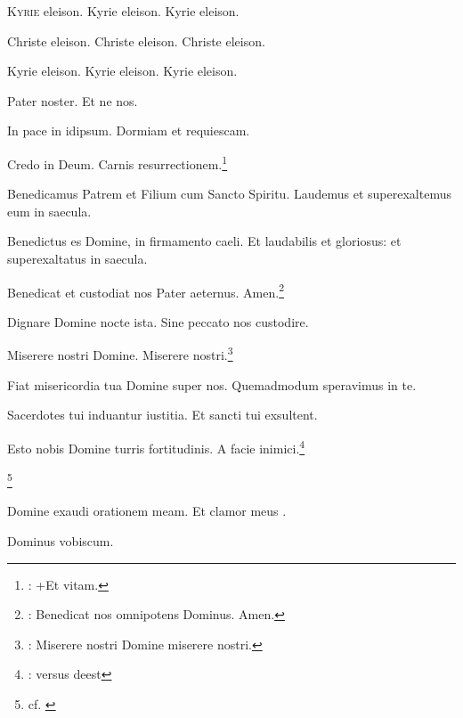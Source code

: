 %
\lettrine{K}{yrie} eleison. Kyrie eleison. Kyrie eleison.

\hspace{24pt}Christe eleison. Christe eleison. Christe eleison. %

Kyrie eleison. Kyrie eleison. Kyrie eleison.

\vspace{1mm}
Pater noster. Et ne nos.

 In pace in idipsum. Dormiam et requiescam.

Credo in Deum. Carnis resurrectionem.\footnote{\cite[1v]{xiv_a_19}: +Et vitam.}


 Benedicamus Patrem et Filium cum Sancto Spiritu.
Laudemus et superexaltemus eum in saecula.

 Benedictus es Domine, in firmamento caeli.
Et laudabilis et gloriosus: et superexaltatus in saecula.

 Benedicat et custodiat nos Pater aeternus. Amen.\footnote{%
  \cite[2r]{xiv_a_19}: Benedicat nos omnipotens Dominus. Amen.}

 Dignare Domine nocte ista.
Sine peccato nos custodire.

 Miserere nostri Domine. Miserere nostri.\footnote{%
  \cite[2r]{xiv_a_19}:  Miserere nostri Domine miserere nostri.}

 Fiat misericordia tua Domine super nos.
Quemadmodum speravimus in te.

 Sacerdotes tui induantur iustitia. %
Et sancti tui exsultent.

 Esto nobis Domine turris fortitudinis.
A facie inimici.\footnote{%
  \cite{xiv_a_19}: versus deest} %

\vspace{1mm}
\footnote{cf. \cite[2r]{xiv_a_19}}
\vspace{1mm}

 Domine exaudi orationem meam.
Et clamor meus .

Dominus vobiscum.
